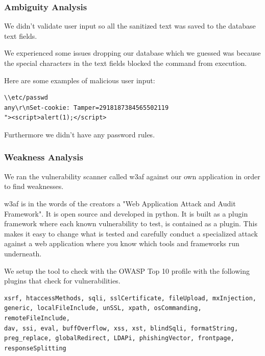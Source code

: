 \documentclass[a4paper]{article}
\begin{document}
\subsubsection{Ambiguity Analysis}

We didn't validate user input so all the sanitized text was saved to the database text fields. 

We experienced some issues dropping our database which we guessed was because the special characters in the text fields blocked the command from execution.

Here are some examples of malicious user input:
\begin{verbatim}
\\etc/passwd
any\r\nSet-cookie: Tamper=2918187384565502119
"><script>alert(1);</script>
\end{verbatim}

Furthermore we didn't have any password rules.

\subsubsection{Weakness Analysis}
We ran the vulnerability scanner called w3af against our own application in order to find weaknesses.

w3af is in the words of the creators a "Web Application Attack and Audit Framework". It is open source and developed in python. It is built as a plugin framework where each known vulnerability to test, is contained as a plugin. This makes it easy to change what is tested and carefully conduct a specialized attack against a web application where you know which tools and frameworks run underneath.

We setup the tool to check with the OWASP Top 10 profile with the following plugins that check for vulnerabilities.

\begin{verbatim}
xsrf, htaccessMethods, sqli, sslCertificate, fileUpload, mxInjection, 
generic, localFileInclude, unSSL, xpath, osCommanding, remoteFileInclude, 
dav, ssi, eval, buffOverflow, xss, xst, blindSqli, formatString, 
preg_replace, globalRedirect, LDAPi, phishingVector, frontpage, 
responseSplitting
\end{verbatim}
     
\end{document}
